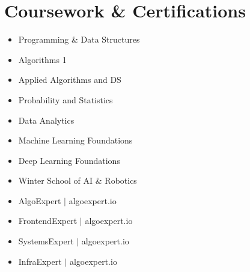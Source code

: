 \documentclass[letterpaper,11pt]{article}
\begin{document}
\section{Coursework \& Certifications}
        \begin{multicols}{3}
            \begin{itemize}[itemsep=-5pt, parsep=3pt]
                \item Programming \& Data Structures
                \item Algorithms 1
                \item Applied Algorithms and DS
                \item Probability and Statistics
                \item Data Analytics
                \item Machine Learning Foundations
                \item Deep Learning Foundations
                \item Winter School of AI \& Robotics
                \item AlgoExpert $|$ algoexpert.io
                \item FrontendExpert $|$ algoexpert.io
                \item SystemsExpert $|$ algoexpert.io
                \item InfraExpert $|$ algoexpert.io
            \end{itemize}
        \end{multicols}
\end{document}
